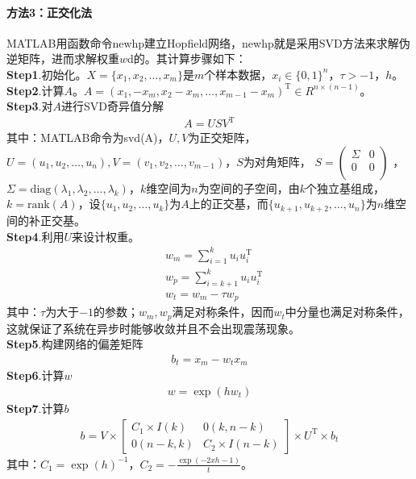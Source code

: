 {            \paragraph{方法3：正交化法}MATLAB用函数命令newhp建立Hopfield网络，newhp就是采用SVD方法来求解伪逆矩阵，进而求解权重$w$d的。其计算步骤如下：\\
            \textbf{Step1}.初始化。$X=\{x_1,x_2,\dots,x_m\}$是$m$个样本数据，$x_i\in \{0,1\}^n$，$\tau>-1$，$h$。\\
            \textbf{Step2}.计算$A$。$A = (x_1,-x_m,x_2-x_m,\dots,x_{m-1}-x_m)^\mathrm{T}\in R^{n\times (n-1)}$。\\
            \textbf{Step3}.对$A$进行SVD奇异值分解
            \begin{align*}
            A = USV^\mathrm{T}
            \end{align*}
            其中：MATLAB命令为svd(A)，$U,V$为正交矩阵，$U = (u_1,u_2,\dots,u_n),V = (v_1,v_2,\dots,v_{m-1})$，$S$为对角矩阵，
            \begin{math}
            S=
            \left(
            \begin{smallmatrix}
            \Sigma & 0\\
            0&0\\
            \end{smallmatrix}
             \right)
            \end{math}
            ，$\Sigma=\mathrm{diag}(\lambda_1,\lambda_2,\dots,\lambda_k)$，$k$维空间为$n$为空间的子空间，由$k$个独立基组成，$k = \mathrm{rank}(A)$，设$\{u_1,u_2,\dots,u_k\}$为$A$上的正交基，而$\{u_{k+1},u_{k+2},\dots,u_n\}$为$n$维空间的补正交基。\\
            \textbf{Step4}.利用$U$来设计权重。
            \begin{align*}
            & w_m = \sum_{i=1}^ku_iu_i^\mathrm{T}\\
            & w_p = \sum_{i=k+1}^ku_iu_i^\mathrm{T}\\
            & w_t = w_m - \tau w_p
            \end{align*}
            其中：$\tau$为大于$-1$的参数；$w_m,w_p$满足对称条件，因而$w_t$中分量也满足对称条件，这就保证了系统在异步时能够收敛并且不会出现震荡现象。\\
            \textbf{Step5}.构建网络的偏差矩阵
            \begin{align*}
            b_t = x_m - w_tx_m
            \end{align*}
            \textbf{Step6}.计算$w$
            \begin{align*}
            w = \exp(hw_t)
            \end{align*}
            \textbf{Step7}.计算$b$
            \begin{align*}
            b = V\times
            \begin{bmatrix}
            C_1\times I(k) & 0(k,n-k)\\
            0(n-k,k)&C_2\times I(n-k)
            \end{bmatrix}
            \times U^\mathrm{T}\times b_t
            \end{align*}
            其中：$C_1 = \exp(h)^{-1}$，$C_2 = -\frac{\exp(-2xh-1)}{t}$。
}
